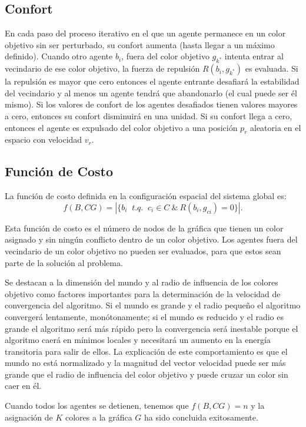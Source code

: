 \documentclass[a4paper]{report}
\begin{document}
\subsection{Confort}

En cada paso del proceso iterativo en el que un agente permanece en un color
objetivo sin ser perturbado, su confort aumenta (hasta llegar a un m\'aximo
definido). Cuando otro agente $b_i$, fuera del color objetivo $g_{k^*}$ intenta
entrar al vecindario de ese color objetivo, la fuerza de repulsi\'on $R(b_i, g_{k^*})$
es evaluada. Si la repulsi\'on es mayor que cero entonces el agente entrante
desafiar\'a la estabilidad del vecindario y al menos un agente tendr\'a que
abandonarlo (el cual puede ser \'el mismo). Si los valores de confort
de los agentes desafiados tienen valores mayores a cero, entonces su confort
disminuir\'a en una unidad. Si su confort llega a cero, entonces el agente
es expulsado del color objetivo a una posici\'on $p_r$ aleatoria en el espacio
con velocidad $v_r$.

\subsection{Funci\'on de Costo}
La funci\'on de costo definida en la configuraci\'on espacial del sistema global es:
\[f(B, CG) = |\{b_i  \ \textit{ t.q. } \ c_i \in C \ \& \ R(b_i, g_{ci}) = 0\}|.\]

Esta funci\'on de costo es el n\'umero de nodos de la gr\'afica que tienen un color
asignado y sin ning\'un conflicto dentro de un color objetivo. Los agentes fuera
del vecindario de un color objetivo no pueden ser evaluados, para que estos sean
parte de la soluci\'on al problema.

Se destacan a la dimensi\'on del mundo y al radio de influencia de los colores
objetivo como factores importantes para la determinaci\'on de la velocidad de
convergencia del algoritmo. Si el mundo es grande y el radio peque\~no el
algoritmo converger\'a lentamente, mon\'otonamente; si el mundo es reducido
y el radio es grande el algoritmo ser\'a m\'as r\'apido pero la convergencia
ser\'a inestable porque el algoritmo caer\'a en m\'inimos locales y necesitar\'a
un aumento en la energ\'ia transitoria para salir de ellos. La explicaci\'on de
este comportamiento es que el mundo no est\'a normalizado y la magnitud del vector
velocidad puede ser m\'as grande que el radio de influencia del color objetivo
y puede cruzar un color sin caer en \'el.

Cuando todos los agentes se detienen, tenemos que $f(B, CG) = n$ y la asignaci\'on
de $K$ colores a la gr\'afica $G$ ha sido concluida exitosamente.
\end{document}
